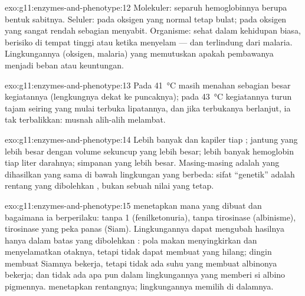 \begin{solution}{exo:g11:enzymes-and-phenotype:12}
Molekuler: separuh hemoglobinnya berupa bentuk sabitnya. Seluler: pada
oksigen yang normal  tetap bulat; pada oksigen yang sangat rendah
sebagian menyabit. Organisme: sehat dalam kehidupan biasa, berisiko di
tempat tinggi atau ketika menyelam --- dan terlindung dari malaria.
Lingkungannya (oksigen, malaria) yang memutuskan apakah 
pembawanya menjadi beban atau keuntungan.
\end{solution}

\begin{solution}{exo:g11:enzymes-and-phenotype:13}
Pada \qty{41}{\celsius}  masih menahan sebagian besar
kegiatannya (lengkungnya dekat ke puncaknya); pada \qty{43}{\celsius}
kegiatannya turun tajam seiring  yang mulai terbuka
lipatannya, dan jika terbukanya berlanjut, ia tak terbalikkan:  musnah
alih-alih melambat.
\end{solution}

\begin{solution}{exo:g11:enzymes-and-phenotype:14}
Lebih banyak  dan kapiler tiap ; jantung yang
lebih besar dengan volume sekuncup yang lebih besar; lebih banyak
hemoglobin tiap liter darahnya; simpanan  yang lebih besar.
Masing-masing adalah  yang dihasilkan  yang sama di
bawah lingkungan yang berbeda: sifat ``genetik'' adalah rentang yang
dibolehkan , bukan sebuah nilai yang tetap.
\end{solution}

\begin{solution}{exo:g11:enzymes-and-phenotype:15}
 menetapkan  mana yang dibuat dan bagaimana ia
berperilaku: tanpa  1 (fenilketonuria), tanpa tirosinase
(albinisme), tirosinase yang peka panas (Siam). Lingkungannya dapat
mengubah hasilnya hanya dalam batas yang dibolehkan : pola
makan menyingkirkan  dan menyelamatkan otaknya, tetapi tidak
dapat membuat  yang hilang; dingin membuat  Siamnya bekerja,
tetapi tidak ada suhu yang membuat  albinonya bekerja; dan tidak
ada apa pun dalam lingkungannya yang memberi si albino pigmennya.
 menetapkan rentangnya; lingkungannya memilih di dalamnya.
\end{solution}

